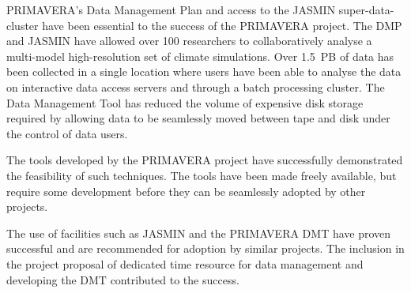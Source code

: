 \documentclass[gmd, manuscript]{copernicus}
\begin{document}
\conclusions  %

PRIMAVERA's Data Management Plan and access to the JASMIN super-data-cluster have been essential to the success of the PRIMAVERA project. The DMP and JASMIN have allowed over 100 researchers to collaboratively analyse a multi-model high-resolution set of climate simulations. Over 1.5~PB of data has been collected in a single location where users have been able to analyse the data on interactive data access servers and through a batch processing cluster. The Data Management Tool has reduced the volume of expensive disk storage required by allowing data to be seamlessly moved between tape and disk under the control of data users.

The tools developed by the PRIMAVERA project have successfully demonstrated the feasibility of such techniques. The tools have been made freely available, but require some development before they can be seamlessly adopted by other projects.

The use of facilities such as JASMIN and the PRIMAVERA DMT have proven successful and are recommended for adoption by similar projects. The inclusion in the project proposal of dedicated time resource for data management and developing the DMT contributed to the success.












\end{document}
